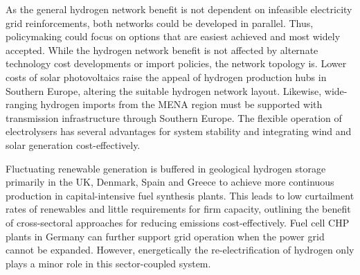 As the general hydrogen network benefit is not dependent on infeasible
electricity grid reinforcements, both networks could be developed in parallel.
Thus, policymaking could focus on options that are easiest achieved and most
widely accepted. While the hydrogen network benefit is not affected by alternate
technology cost developments or import policies, the network topology is. Lower
costs of solar photovoltaics raise the appeal of hydrogen production hubs in
Southern Europe, altering the suitable hydrogen network layout. Likewise,
wide-ranging hydrogen imports from the MENA region must be supported with
transmission infrastructure through Southern Europe. The flexible operation of
electrolysers has several advantages for system stability and integrating wind
and solar generation cost-effectively.

Fluctuating renewable generation is buffered in geological hydrogen storage
primarily in the UK, Denmark, Spain and Greece to achieve more continuous
production in capital-intensive fuel synthesis plants. This leads to low
curtailment rates of renewables and little requirements for firm capacity,
outlining the benefit of cross-sectoral approaches for reducing \co emissions
cost-effectively. Fuel cell CHP plants in Germany can further support grid
operation when the power grid cannot be expanded. However, energetically the
re-electrification of hydrogen only plays a minor role in this sector-coupled
system.